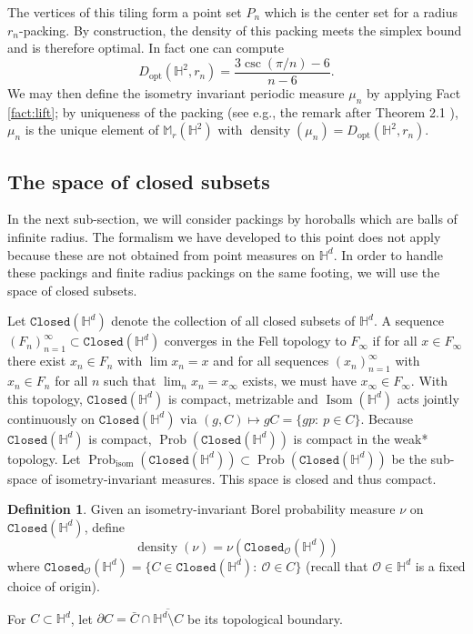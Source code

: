 \documentclass[11pt]{amsart}
\theoremstyle{definition}
\newtheorem{definition}[theorem]{Definition}
\theoremstyle{remark}
\renewcommand{\H}{\mathbb{H}}
\newcommand{\M}{\mathbb{M}}
\newcommand{\cO}{\mathcal{O}}
\newcommand{\Closed}{\mathtt{Closed}}
\newcommand{\isom}{\operatorname{isom}}
\newcommand{\Isom}{\operatorname{Isom}}
\newcommand{\density}{\operatorname{density}}
\newcommand{\opt}{\operatorname{opt}}
\newcommand{\Prob}{\operatorname{Prob}}
\newcommand{\Dopt}{D_{\opt}}
\begin{document}
The vertices of this tiling form a point set $P_n$ which is the center set for a radius $r_n$-packing. By construction, the density of this packing meets the simplex bound and is therefore optimal. In fact one can compute  \cite[p. 239]{MR0165423}
$$\Dopt(\H^2,r_n) = \frac{3 \csc(\pi/n)-6}{n-6}.$$
%
We may then define the isometry invariant periodic measure $\mu_n$ by applying Fact \ref{fact:lift}; by uniqueness of the packing (see e.g., the remark after Theorem 2.1 \cite{kellerhals1998ball}), $\mu_n$ is the unique element of $\M_r(\H^2)$ with $\density(\mu_n) = \Dopt(\H^2,r_n).$


\subsection{The space of closed subsets}

In the next sub-section, we will consider packings by horoballs which are balls of infinite radius. The formalism we have developed to this point does not apply because these are not obtained from point measures on $\H^d$. In order to handle these packings and finite radius packings on the same footing, we will use the space of closed subsets. 

Let $\Closed(\H^d)$ denote the collection of all closed subsets of $\H^d$.  A sequence $(F_n)_{n=1}^\infty \subset \Closed(\H^d)$ converges in the Fell topology to $F_\infty$ if for all $x\in F_\infty$ there exist $x_n\in F_n$ with $\lim x_n = x$ and for all sequences $(x_n)_{n=1}^\infty$ with $x_n \in F_n$ for all $n$ such that $\lim_n x_n = x_\infty$ exists, we must have $x_\infty \in F_\infty$. With this topology, $\Closed(\H^d)$ is compact, metrizable and $\Isom(\H^d)$ acts jointly continuously on $\Closed(\H^d)$ via $(g,C) \mapsto gC=\{gp:~p\in C\}$. Because $\Closed(\H^d)$ is compact, $\Prob(\Closed(\H^d))$ is compact in the weak* topology. Let 
 $\Prob_{\isom} (\Closed(\H^d)) \subset \Prob(\Closed(\H^d))$ be the sub-space of isometry-invariant measures. This space is closed and thus compact.

\begin{definition}
   Given an isometry-invariant Borel probability measure $\nu$ on $\Closed(\H^d)$, define 
   $$\density(\nu) = \nu(\Closed_\cO(\H^d))$$
   where $\Closed_\cO(\H^d)=\{C\in \Closed(\H^d):~\cO \in C\}$ (recall that $\cO\in \H^d$ is a fixed choice of origin). 
\end{definition}
For $C \subset \H^d$, let $\partial C = \bar{C} \cap \overline{\H^d \setminus C}$ be its topological boundary.
\end{document}
